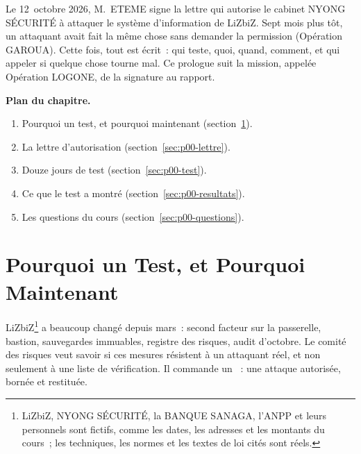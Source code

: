 Le 12~octobre 2026, M.~ETEME signe la lettre qui autorise le cabinet NYONG
SÉCURITÉ à attaquer le système d'information de LiZbiZ. Sept mois plus tôt,
un attaquant avait fait la même chose sans demander la permission
(Opération GAROUA). Cette fois, tout est écrit~: qui teste, quoi, quand,
comment, et qui appeler si quelque chose tourne mal. Ce prologue suit la
mission, appelée Opération LOGONE, de la signature au rapport.

\medskip
\textbf{Plan du chapitre.}
\begin{enumerate}
    \item Pourquoi un test, et pourquoi maintenant (section~\ref{sec:p00-pourquoi}).
    \item La lettre d'autorisation (section~\ref{sec:p00-lettre}).
    \item Douze jours de test (section~\ref{sec:p00-test}).
    \item Ce que le test a montré (section~\ref{sec:p00-resultats}).
    \item Les questions du cours (section~\ref{sec:p00-questions}).
\end{enumerate}

\separateur

\section{Pourquoi un Test, et Pourquoi Maintenant}
\label{sec:p00-pourquoi}

LiZbiZ\footnote{LiZbiZ, NYONG SÉCURITÉ, la BANQUE SANAGA, l'ANPP et leurs
personnels sont fictifs, comme les dates, les adresses et les montants du
cours~; les techniques, les normes et les textes de loi cités sont réels.}
a beaucoup changé depuis mars~: second facteur sur la passerelle, bastion,
sauvegardes immuables, registre des risques, audit d'octobre. Le comité des
risques veut savoir si ces mesures résistent à un attaquant réel, et non
seulement à une liste de vérification. Il commande un ~: une attaque autorisée, bornée et restituée.

